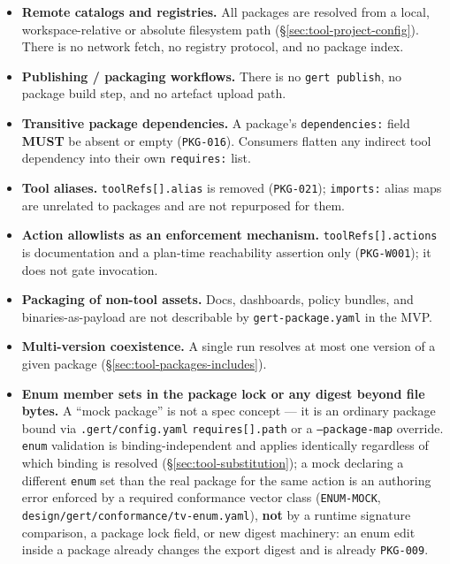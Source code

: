 \begin{itemize}
  \item \textbf{Remote catalogs and registries.} All packages are resolved
        from a local, workspace-relative or absolute filesystem path
        (\S\ref{sec:tool-project-config}). There is no network fetch, no
        registry protocol, and no package index.
  \item \textbf{Publishing / packaging workflows.} There is no
        \texttt{gert publish}, no package build step, and no artefact
        upload path.
  \item \textbf{Transitive package dependencies.} A package's
        \texttt{dependencies:} field \textbf{MUST} be absent or empty
        (\texttt{PKG-016}). Consumers flatten any indirect tool dependency
        into their own \texttt{requires:} list.
  \item \textbf{Tool aliases.} \texttt{toolRefs[].alias} is removed
        (\texttt{PKG-021}); \texttt{imports:} alias maps are unrelated to
        packages and are not repurposed for them.
  \item \textbf{Action allowlists as an enforcement mechanism.}
        \texttt{toolRefs[].actions} is documentation and a plan-time
        reachability assertion only (\texttt{PKG-W001}); it does not gate
        invocation.
  \item \textbf{Packaging of non-tool assets.} Docs, dashboards, policy
        bundles, and binaries-as-payload are not describable by
        \texttt{gert-package.yaml} in the MVP.
  \item \textbf{Multi-version coexistence.} A single run resolves at most
        one version of a given package (\S\ref{sec:tool-packages-includes}).
  \item \textbf{Enum member sets in the package lock or any digest beyond
        file bytes.} A ``mock package'' is not a spec concept --- it is an
        ordinary package bound via \texttt{.gert/config.yaml}
        \texttt{requires[].path} or a \texttt{--package-map} override.
        \texttt{enum} validation is binding-independent and applies
        identically regardless of which binding is resolved
        (\S\ref{sec:tool-substitution}); a mock declaring a different
        \texttt{enum} set than the real package for the same action is an
        authoring error enforced by a required conformance vector class
        (\texttt{ENUM-MOCK}, \texttt{design/gert/conformance/tv-enum.yaml}),
        \textbf{not} by a runtime signature comparison, a package lock
        field, or new digest machinery: an enum edit inside a package
        already changes the export digest and is already \texttt{PKG-009}.
\end{itemize}

